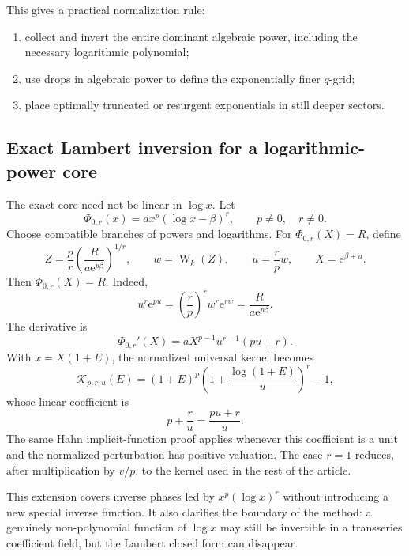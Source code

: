 \documentclass[11pt,oneside]{article}
\theoremstyle{plain}
\theoremstyle{definition}
\theoremstyle{remark}
\newcommand{\W}{\operatorname{W}}
\newcommand{\e}{\mathrm{e}}
\newcommand{\Kcal}{\mathcal{K}}
\begin{document}
This gives a practical normalization rule:
\begin{enumerate}
\item collect and invert the entire dominant algebraic power, including the
      necessary logarithmic polynomial;
\item use drops in algebraic power to define the exponentially finer \(q\)-grid;
\item place optimally truncated or resurgent exponentials in still deeper
      sectors.
\end{enumerate}

\subsection{Exact Lambert inversion for a logarithmic-power core}
\label{sec:log-power-core}

The exact core need not be linear in \(\log x\).  Let
\begin{equation}
 \Phi_{0,r}(x)=a x^p(\log x-\beta)^r,
 \qquad p\ne0,\quad r\ne0.
 \label{eq:log-power-core}
\end{equation}
Choose compatible branches of powers and logarithms.  For
\(\Phi_{0,r}(X)=R\), define
\begin{equation}
 Z=\frac pr\left(\frac{R}{a\e^{p\beta}}\right)^{1/r},
 \qquad
 w=\W_k(Z),
 \qquad
 u=\frac rp w,
 \qquad
 X=\e^{\beta+u}.
 \label{eq:log-power-core-inverse}
\end{equation}
Then \(\Phi_{0,r}(X)=R\).  Indeed,
\[
 u^r\e^{pu}
 =\left(\frac rp\right)^rw^r\e^{rw}
 =\frac{R}{a\e^{p\beta}}.
\]
The derivative is
\begin{equation}
 \Phi_{0,r}'(X)
 =aX^{p-1}u^{r-1}(pu+r).
 \label{eq:log-power-core-slope}
\end{equation}
With \(x=X(1+E)\), the normalized universal kernel becomes
\begin{equation}
 \Kcal_{p,r,u}(E)
 =(1+E)^p
 \left(1+\frac{\log(1+E)}{u}\right)^r-1,
 \label{eq:log-power-kernel}
\end{equation}
whose linear coefficient is
\begin{equation}
 p+\frac ru=\frac{pu+r}{u}.
 \label{eq:log-power-linear}
\end{equation}
The same Hahn implicit-function proof applies whenever this coefficient is a
unit and the normalized perturbation has positive valuation.  The case
\(r=1\) reduces, after multiplication by \(v/p\), to the kernel used in the
rest of the article.

This extension covers inverse phases led by
\(x^p(\log x)^r\) without introducing a new special inverse function.  It also
clarifies the boundary of the method: a genuinely non-polynomial function of
\(\log x\) may still be invertible in a transseries coefficient field, but the
Lambert closed form can disappear.
\end{document}

